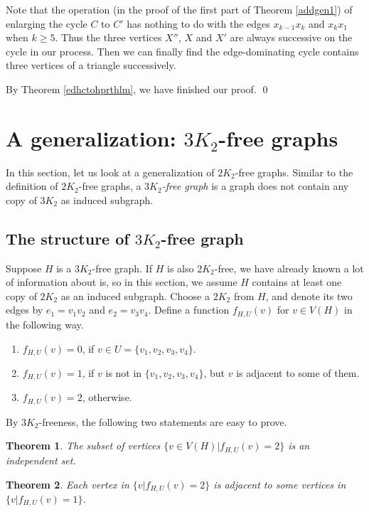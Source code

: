 \documentclass[12pt]{report}
\newtheorem{theorem}{Theorem}
\begin{document}
Note that the operation (in the proof of the first part of Theorem \ref{addgen1}) of enlarging the cycle $C$ to $C'$ has nothing to do with the edges $x_{k-1}x_k$ and $x_kx_1$ when $k\ge5$. Thus the three vertices $X''$, $X$ and $X'$ are always successive on the cycle in our process. Then we can finally find the edge-dominating cycle contains three vertices of a triangle successively.


By Theorem \ref{edhctohprthlm}, we have finished our proof.
\qed






\section{A generalization: $3K_2$-free graphs}\label{sec553k2}
In this section, let us look at a generalization of $2K_2$-free graphs. Similar to the definition of $2K_2$-free graphs, a {\em $3K_2$-free graph} is a graph does not contain any copy of $3K_2$ as induced subgraph.

\subsection{The structure of $3K_2$-free graph}
Suppose $H$ is a $3K_2$-free graph. If $H$ is also $2K_2$-free, we have already known a lot of information about is, so in this section, we assume $H$ contains at least one copy of $2K_2$ as an induced subgraph. Choose a $2K_2$ from $H$, and denote its two edges by $e_1=v_1v_2$ and $e_2=v_3v_4$. Define a function $f_{H,U}(v)$ for $v\in V(H)$ in the following way.
\begin{enumerate}
\item $f_{H,U}(v)=0$, if $v\in U=\{v_1,v_2,v_3,v_4\}$.
\item $f_{H,U}(v)=1$, if $v$ is not in $\{v_1,v_2,v_3,v_4\}$, but $v$ is adjacent to some of them.
\item $f_{H,U}(v)=2$, otherwise.
\end{enumerate}

By $3K_2$-freeness, the following two statements are easy to prove.
\begin{theorem}
The subset of vertices $\{v\in V(H)|f_{H,U}(v)=2\}$ is an independent set.
\end{theorem}

\begin{theorem}
Each vertex in $\{v|f_{H,U}(v)=2\}$ is adjacent to some vertices in $\{v|f_{H,U}(v)=1\}$.
\end{theorem}
\end{document}
